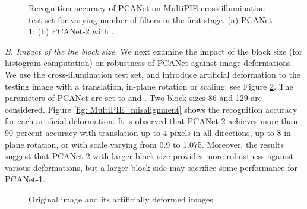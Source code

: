 \documentclass[10pt,journal,compsoc]{IEEEtran}
\begin{document}
\begin{figure}[t]
\centering
{}\hspace{0cm} 
\caption{Recognition accuracy of PCANet on MultiPIE cross-illumination test set for varying number of filters in the first stage. (a) PCANet-1; (b) PCANet-2 with .}\label{fig: MultiPIE_K1}
\end{figure}

\vspace{0.3\baselineskip}
{\em B. Impact of the the block size.} We next examine the impact of the block size (for histogram computation) on robustness of PCANet against image deformations. We use the cross-illumination test set, and introduce artificial deformation to the testing image with a translation, in-plane rotation or scaling; see Figure \ref{fig: artificial}. The parameters of PCANet are set to  and . Two block sizes 86 and 129 are considered. Figure \ref{fig: MultiPIE_misalignment} shows the recognition accuracy for each artificial deformation. It is observed that PCANet-2 achieves more than 90 percent accuracy with translation up to 4 pixels in all directions, up to 8 in-plane rotation, or with scale varying from 0.9 to 1.075. Moreover, the results suggest that PCANet-2 with larger block size provides more robustness against various deformations, but a larger block side may sacrifice some performance for PCANet-1.


\begin{figure}[t]
\centering
{}
\caption{Original image and its artificially deformed images.}\label{fig: artificial}
\end{figure}
\end{document}
